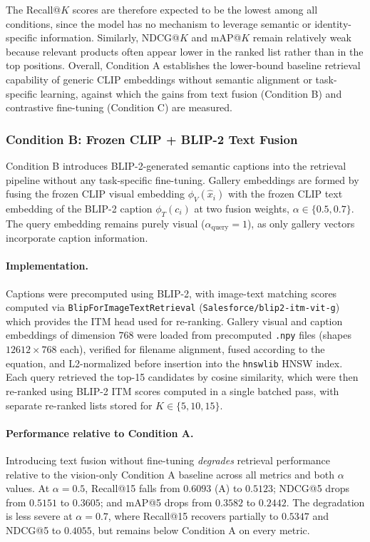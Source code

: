 \documentclass[12pt,a4paper]{article}
\begin{document}
The Recall@$K$ scores are therefore expected to be the lowest among all
conditions, since the model has no mechanism to leverage semantic or
identity-specific information. Similarly, NDCG@$K$ and mAP@$K$ remain
relatively weak because relevant products often appear lower in the ranked
list rather than in the top positions. Overall, Condition A establishes the
lower-bound baseline retrieval capability of generic CLIP embeddings without
semantic alignment or task-specific learning, against which the gains from
text fusion (Condition B) and contrastive fine-tuning (Condition C) are
measured.
\vspace{0.3cm}

\subsubsection{Condition B: Frozen CLIP + BLIP-2 Text Fusion}
\label{sec:condition_b}

Condition B introduces BLIP-2-generated semantic captions into the retrieval
pipeline without any task-specific fine-tuning. Gallery embeddings are formed
by fusing the frozen CLIP visual embedding $\phi_V(\hat{x}_i)$ with the
frozen CLIP text embedding of the BLIP-2 caption $\phi_T(c_i)$ at two fusion
weights, $\alpha \in \{0.5, 0.7\}$. The query embedding remains purely visual
($\alpha_{\text{query}} = 1$), as only gallery vectors incorporate caption
information.

\paragraph{Implementation.}
Captions were precomputed using BLIP-2, with image-text matching scores
computed via \texttt{BlipForImageTextRetrieval} (\texttt{Salesforce/blip2-itm-vit-g})
which provides the ITM head used for re-ranking. Gallery visual and caption embeddings of dimension $768$ were loaded
from precomputed \texttt{.npy} files (shapes $12612 \times 768$ each), verified
for filename alignment, fused according to the equation, and
L2-normalized before insertion into the \texttt{hnswlib} HNSW index.
Each query retrieved the top-15
candidates by cosine similarity, which were then re-ranked using BLIP-2 ITM
scores computed in a single batched pass, with separate re-ranked lists stored
for $K \in \{5, 10, 15\}$.

\paragraph{Performance relative to Condition A.}
Introducing text fusion without fine-tuning \emph{degrades} retrieval
performance relative to the vision-only Condition A baseline across all metrics
and both $\alpha$ values. At $\alpha{=}0.5$, Recall@15 falls from $0.6093$
(A) to $0.5123$; NDCG@5 drops from $0.5151$ to $0.3605$; and mAP@5 drops from
$0.3582$ to $0.2442$. The degradation is less severe at $\alpha{=}0.7$, where
Recall@15 recovers partially to $0.5347$ and NDCG@5 to $0.4055$, but remains
below Condition A on every metric.
\end{document}

